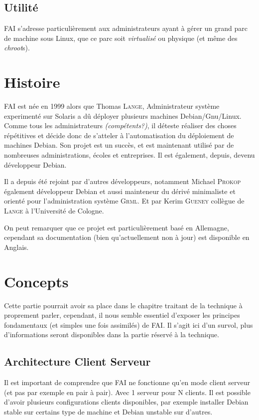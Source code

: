 \documentclass[a4paper,12pt,one side,titlepage]{report}
\begin{document}
\subsection{Utilité}
\textsc{FAI} s'adresse particulièrement aux administrateurs ayant à gérer un grand parc de machine sous Linux, que ce parc soit \textit{virtualisé} ou physique (et même des \textit{chroot}s).

\section{Histoire}
\textsc{FAI} est née en 1999 alors que Thomas \textsc{Lange}, Administrateur système experimenté sur Solaris a dû déployer plusieurs machines Debian/Gnu/Linux. Comme tous les administrateurs \textit{(compétents?)}, il déteste réaliser des choses répétitives et décide donc de s'atteler à l'automatisation du déploiement de machines Debian. Son projet est un succès, et est maintenant utilisé par de nombreuses administrations, écoles et entreprises.
Il est également, depuis, devenu développeur Debian.

Il a depuis été rejoint par d'autres développeurs, notamment Michael \textsc{Prokop} également développeur Debian et aussi mainteneur du dérivé minimaliste et orienté pour l'administration système \textsc{Grml}.
Et par Kerim \textsc{Gueney} collègue de \textsc{Lange} à l'Université de Cologne.

On peut remarquer que ce projet est particulièrement basé en Allemagne, cependant sa documentation (bien qu'actuellement non à jour) est disponible en Anglais.



\section{Concepts}
Cette partie pourrait avoir sa place dans le chapitre traitant de la technique à proprement parler, cependant, il nous semble essentiel d'exposer les principes fondamentaux (et simples une fois assimilés) de \textsc{FAI}. Il s'agit ici d'un survol, plus d'informations seront disponibles dans la partie réservé à la technique.

\subsection{Architecture Client Serveur}
Il est important de comprendre que \textsc{FAI} ne fonctionne qu'en mode client serveur (et pas par exemple en pair à pair). Avec 1 serveur pour N clients. Il est possible d'avoir plusieurs configurations clients disponibles, par exemple installer Debian stable sur certains type de machine et Debian unstable sur d'autres. 
\end{document}

